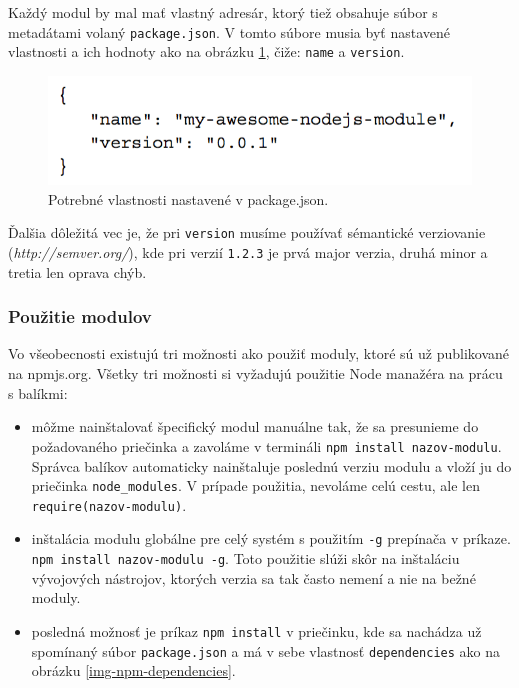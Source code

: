 Každý modul by mal mať vlastný adresár, ktorý tiež obsahuje súbor s metadátami volaný \verb|package.json|. V tomto súbore musia byť nastavené vlastnosti a ich hodnoty ako na obrázku \ref{img-npm-packagejson}, čiže: \verb|name| a \verb|version|.\cite{nodejs-by-example}

\begin{figure}[H]
  \centering
  \includegraphics[scale=0.7]{img/npm/npm-minimum.png}
  \caption{Potrebné vlastnosti nastavené v package.json.}
  \label{img-npm-packagejson}
\end{figure}

Ďalšia dôležitá vec je, že pri \verb|version| musíme používať sémantické verziovanie\\ (\textit{http://semver.org/}), kde pri verzií \verb|1.2.3| je prvá major verzia, druhá minor a tretia len oprava chýb.

\subsubsection{Použitie modulov}
Vo všeobecnosti existujú tri možnosti ako použiť moduly, ktoré sú už publikované na npmjs.org. Všetky tri možnosti si vyžadujú použitie Node manažéra na prácu s balíkmi:\cite{nodejs-by-example}

\begin{itemize}
\item môžme nainštalovať špecifický modul manuálne tak, že sa presunieme do požadovaného priečinka a zavoláme v termináli \verb|npm install nazov-modulu|. Správca balíkov automaticky nainštaluje poslednú verziu modulu a vloží ju do priečinka \verb|node_modules|. V prípade použitia, nevoláme celú cestu, ale len \verb|require(nazov-modulu)|.
\item inštalácia modulu globálne pre celý systém s použitím \verb|-g| prepínača v príkaze. \verb|npm install nazov-modulu -g|. Toto použitie slúži skôr na inštaláciu vývojových nástrojov, ktorých verzia sa tak často nemení a nie na bežné moduly.
\item posledná možnosť je príkaz \verb|npm install| v priečinku, kde sa nachádza už spomínaný súbor \verb|package.json| a má v sebe vlastnosť \verb|dependencies| ako na obrázku \ref{img-npm-dependencies}.
\end{itemize}


